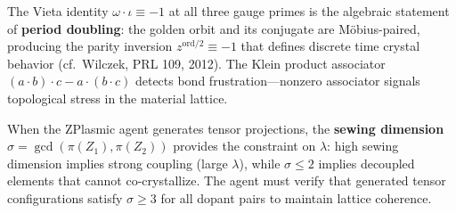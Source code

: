 \documentclass[11pt,a4paper]{article}
\begin{document}
The Vieta identity $\omega \cdot \iota \equiv -1$ at all three gauge primes is the algebraic statement of \textbf{period doubling}: the golden orbit and its conjugate are M\"obius-paired, producing the parity inversion $z^{\mathrm{ord}/2} \equiv -1$ that defines discrete time crystal behavior (cf.\ Wilczek, PRL 109, 2012). The Klein product associator $(a \cdot b) \cdot c - a \cdot (b \cdot c)$ detects bond frustration---nonzero associator signals topological stress in the material lattice.

When the ZPlasmic agent generates tensor projections, the \textbf{sewing dimension} $\sigma = \gcd(\pi(Z_1), \pi(Z_2))$ provides the constraint on $\lambda$: high sewing dimension implies strong coupling (large $\lambda$), while $\sigma \leq 2$ implies decoupled elements that cannot co-crystallize. The agent must verify that generated tensor configurations satisfy $\sigma \geq 3$ for all dopant pairs to maintain lattice coherence.


\end{document}
